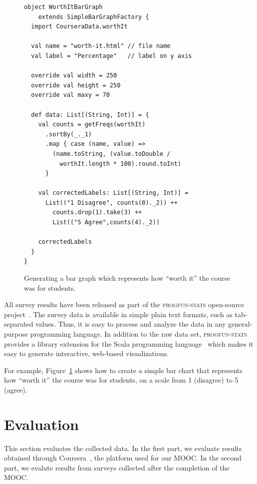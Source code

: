 \documentclass{sig-alternate}
\begin{document}
\begin{figure}[ht!]
  \begin{lstlisting}
object WorthItBarGraph
    extends SimpleBarGraphFactory {
  import CourseraData.worthIt

  val name = "worth-it.html" // file name
  val label = "Percentage"   // label on y axis

  override val width = 250
  override val height = 250
  override val maxy = 70

  def data: List[(String, Int)] = {
    val counts = getFreqs(worthIt)
      .sortBy(_._1)
      .map { case (name, value) =>
        (name.toString, (value.toDouble /
          worthIt.length * 100).round.toInt)
      }

    val correctedLabels: List[(String, Int)] =
      List(("1 Disagree", counts(0)._2)) ++
        counts.drop(1).take(3) ++
        List(("5 Agree",counts(4)._2))

    correctedLabels
  }
}
  \end{lstlisting}
  \caption{Generating a bar graph which
    represents how ``worth it'' the course was for students.}

  \label{fig:bar-chart}
\end{figure}

All survey results have been released as part of the \textsc{progfun-stats} open-source
project~\cite{progfun-stats}. The survey data is available in simple
plain text formats, such  as tab-separated values. Thus, it is easy to process
and analyze the data in any general-purpose programming language. In addition
to the raw data set, \textsc{progfun-stats} provides a library extension for
the Scala programming language~\cite{Odersky-Spoon-Venners07} which makes it
easy to generate interactive, web-based visualizations.

For example, Figure~\ref{fig:bar-chart} shows how to create a simple bar chart
that represents how ``worth it'' the course was for students, on a scale from
1 (disagree) to 5 (agree).


\section{Evaluation}\label{sec:eval}

This section evaluates the collected data. In the first part, we evaluate
results obtained through Coursera~\cite{coursera}, the platform used for our
MOOC. In the second part, we evalute results from surveys collected after the
completion of the MOOC.
\end{document}
